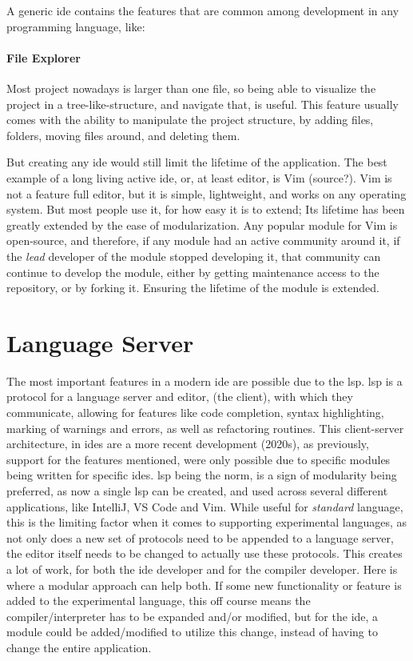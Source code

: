 A generic \gls{ide} contains the features that are common among development in
any programming language, like:

\paragraph{File Explorer} Most project nowadays is larger than one file, so
being able to visualize the project in a tree-like-structure, and navigate that,
is useful. This feature usually comes with the ability to manipulate the project
structure, by adding files, folders, moving files around, and deleting them.

But creating any \gls{ide} would still limit the lifetime of the application.
The best example of a long living active \gls{ide}, or, at least editor, is Vim
(source?). Vim is not a feature full editor, but it is simple, lightweight, and
works on any operating system. But most people use it, for how easy it is to
extend; Its lifetime has been greatly extended by the ease of modularization.
Any popular module for Vim is open-source, and therefore, if any module had an
active community around it, if the \textit{lead} developer of the module stopped
developing it, that community can continue to develop the module, either by
getting maintenance access to the repository, or by forking it. Ensuring the
lifetime of the module is extended.


\section{Language Server}

The most important features in a modern \gls{ide} are possible due to the
\gls{lsp}. \gls{lsp} is a protocol for a language server and editor,
(the client), with which they communicate, allowing for features like code
completion, syntax highlighting, marking of warnings and errors, as well as
refactoring routines. This client-server architecture, in \gls{ide}s are a
more recent development (2020s), as previously, support for the features
mentioned, were only possible due to specific modules being written for
specific \gls{ide}s. \gls{lsp} being the norm, is a sign of modularity being
preferred, as now a single \gls{lsp} can be created, and used across several
different applications, like IntelliJ, VS Code and Vim. While useful for
\textit{standard} language, this is the limiting factor when it comes to
supporting experimental languages, as not only does a new set of protocols need
to be appended to a language server, the editor itself needs to be changed to
actually use these protocols. This creates a lot of work, for both the \gls{ide}
developer and for the compiler developer. Here is where a modular approach can
help both. If some new functionality or feature is added to the experimental
language, this off course means the compiler/interpreter has to be expanded
and/or modified, but for the \gls{ide}, a module could be added/modified to
utilize this change, instead of having to change the entire application.

